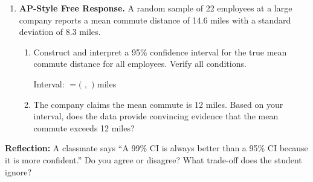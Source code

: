 \documentclass[10pt]{article}
\begin{document}
\begin{enumerate}
  \item \textbf{AP-Style Free Response.} A random sample of 22 employees at a
        large company reports a mean commute distance of 14.6 miles with a standard
        deviation of 8.3 miles.

        \begin{enumerate}[label=\alph*.]
          \item Construct and interpret a 95\% confidence interval for the true mean
                commute distance for all employees. Verify all conditions. 

                Interval: $= ($ \blank{2cm}$,$ \blank{2cm}$)$ miles

          \item The company claims the mean commute is 12 miles. Based on your interval,
                does the data provide convincing evidence that the mean commute exceeds
                12 miles? 
        \end{enumerate}

\end{enumerate}

\begin{reflectionbox}
\textbf{Reflection:} A classmate says ``A 99\% CI is always better than a 95\% CI
because it is more confident.'' Do you agree or disagree? What trade-off does the
student ignore?

\end{reflectionbox}
\end{document}
